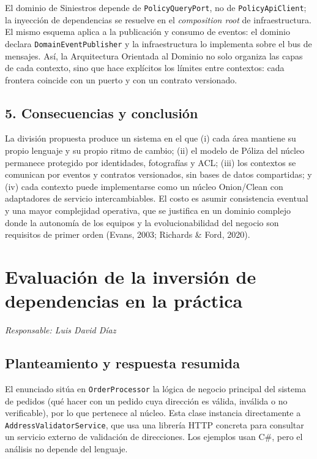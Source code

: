\documentclass[11pt,a4paper]{article}
\newcommand{\responsable}[1]{\noindent\textit{Responsable: #1}\par\medskip}
\begin{document}
El dominio de Siniestros depende de \texttt{PolicyQueryPort}, no de
\texttt{PolicyApiClient}; la inyección de dependencias se resuelve en el
\emph{composition root} de infraestructura. El mismo esquema aplica a la publicación y
consumo de eventos: el dominio declara \texttt{DomainEventPublisher} y la infraestructura
lo implementa sobre el bus de mensajes. Así, la Arquitectura Orientada al Dominio no solo
organiza las capas de cada contexto, sino que hace explícitos los límites entre contextos:
cada frontera coincide con un puerto y con un contrato versionado.

\subsection*{5. Consecuencias y conclusión}

La división propuesta produce un sistema en el que (i) cada área mantiene su propio
lenguaje y su propio ritmo de cambio; (ii) el modelo de Póliza del núcleo permanece
protegido por identidades, fotografías y ACL; (iii) los contextos se comunican por eventos
y contratos versionados, sin bases de datos compartidas; y (iv) cada contexto puede
implementarse como un núcleo Onion/Clean con adaptadores de servicio intercambiables. El
costo es asumir consistencia eventual y una mayor complejidad operativa, que se justifica
en un dominio complejo donde la autonomía de los equipos y la evolucionabilidad del
negocio son requisitos de primer orden (Evans, 2003; Richards \& Ford, 2020).

\newpage
\section{Evaluación de la inversión de dependencias en la práctica}
\responsable{Luis David Díaz}

\subsection*{Planteamiento y respuesta resumida}

El enunciado sitúa en \texttt{OrderProcessor} la lógica de negocio principal del sistema de
pedidos (qué hacer con un pedido cuya dirección es válida, inválida o no verificable), por lo
que pertenece al núcleo. Esta clase instancia directamente a \texttt{AddressValidatorService},
que usa una librería HTTP concreta para consultar un servicio externo de validación de
direcciones. Los ejemplos usan C\#, pero el análisis no depende del lenguaje.
\end{document}
